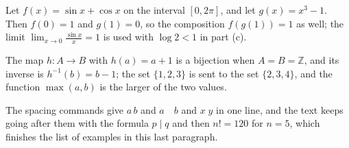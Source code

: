 \documentclass[11pt]{article}
\begin{document}
Let $f(x)=\sin x+\cos x$ on the interval $[0,2\pi]$, and let $g(x)=x^3-1$.
Then $f(0)=1$ and $g(1)=0$, so the composition $f(g(1))=1$ as well; the
limit $\lim_{x\to 0}\frac{\sin x}{x}=1$ is used with $\log 2<1$ in part (c).

The map $h\colon A\to B$ with $h(a)=a+1$ is a bijection when $A=B=\mathbb{Z}$,
and its inverse is $h^{-1}(b)=b-1$; the set $\{1,2,3\}$ is sent to the set
$\{2,3,4\}$, and the function $\max(a,b)$ is the larger of the two values.

The spacing commands give $a\,b$ and $a\quad b$ and $x\;y$ in one line, and
the text keeps going after them with the formula $p\mid q$ and then $n!=120$
for $n=5$, which finishes the list of examples in this last paragraph.
\end{document}
